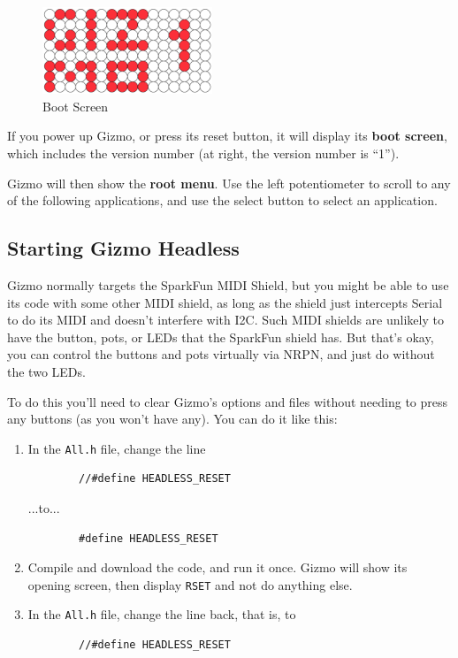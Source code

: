 \documentclass{article}
\begin{document}
\begin{figure}
\vspace{-1.5em}\includegraphics[width=2in]{Gizmo1.pdf}
\vspace{-2em}\caption{\small Boot Screen}\vspace{-2em}
\label{BootScreen}
\end{figure}

If you power up Gizmo, or press its reset button, it will display its {\bf boot screen}, which includes the version number (at right, the version number is ``1'').

Gizmo will then show the {\bf root menu}.  Use the left potentiometer to scroll to any of the following applications, and use the select button to select an application.  

\subsection{Starting Gizmo Headless}

Gizmo normally targets the SparkFun MIDI Shield, but you might be able to use its code with some other MIDI shield, as long as the shield just intercepts Serial to do its MIDI and doesn't interfere with I2C.  Such MIDI shields are unlikely to have the button, pots, or LEDs that the SparkFun shield has.  But that's okay, you can control the buttons and pots virtually via NRPN, and just do without the two LEDs.

To do this you'll need to clear Gizmo's options and files without needing to press any buttons (as you won't have any).  You can do it like this:

\begin{enumerate}
\item In the \texttt{All.h} file, change the line 
\begin{verbatim}
        //#define HEADLESS_RESET
\end{verbatim}
...to...
\begin{verbatim}
        #define HEADLESS_RESET
\end{verbatim}
\item Compile and download the code, and run it once.  Gizmo will show its opening screen, then display \texttt{RSET} and not do anything else.
\item In the \texttt{All.h} file, change the line back, that is, to 
\begin{verbatim}
        //#define HEADLESS_RESET
\end{verbatim}

\end{enumerate}
\end{document}
